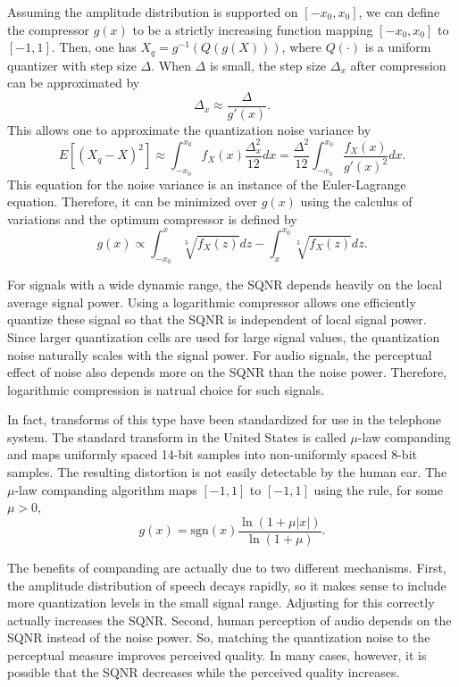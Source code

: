 Assuming the amplitude distribution is supported on $[-x_0 , x_0 ]$, we can define the compressor $g(x)$ to be a strictly increasing function mapping $[ -x_0 , x_0 ]$ to $[ -1 , 1 ]$.
Then, one has $X_q = g^{-1} \left( Q \left( g(X) \right) \right)$, where $Q(\cdot)$ is a uniform quantizer with step size $\Delta$.
When $\Delta$ is small, the step size $\Delta_x$ after compression can be approximated by
\[ \Delta_x \approx \frac{\Delta}{g'(x)}. \]
This allows one to approximate the quantization noise variance by
\[ E \left[ (X_q - X)^2 \right] \approx \int_{-x_0}^{x_0} f_X (x) \frac{\Delta_x^2}{12} dx = \frac{\Delta^2}{12} \int_{-x_0}^{x_0} \frac{f_X (x)}{g'(x)^2} dx. \]
This equation for the noise variance is an instance of the Euler-Lagrange equation.
Therefore, it can be minimized over $g(x)$ using the calculus of variations and the optimum compressor is defined by
\[ g(x) \propto \int_{-x_0}^{x} \sqrt[3]{f_X (z)} dz - \int_{x}^{x_0} \sqrt[3]{f_X (z)} dz . \]

For signals with a wide dynamic range, the SQNR depends heavily on the local average signal power.
Using a logarithmic compressor allows one efficiently quantize these signal so that the SQNR is independent of local signal power.
Since larger quantization cells are used for large signal values, the quantization noise naturally scales with the signal power.
For audio signals, the perceptual effect of noise also depends more on the SQNR than the noise power.
Therefore, logarithmic compression is natrual choice for such signals.

In fact, transforms of this type have been standardized for use in the telephone system.
The standard transform in the United States is called $\mu$-law companding and maps uniformly spaced 14-bit samples into non-uniformly spaced 8-bit samples.
The resulting distortion is not easily detectable by the human ear.
The $\mu$-law companding algorithm maps $[-1,1]$ to $[-1,1]$ using the rule, for some $\mu >0$,
\[ g(x) = \mathrm{sgn}(x)\frac{\ln \left( 1+ \mu |x| \right)}{\ln (1+\mu)}. \]

The benefits of companding are actually due to two different mechanisms.
First, the amplitude distribution of speech decays rapidly, so it makes sense to include more quantization levels in the small signal range.
Adjusting for this correctly actually increases the SQNR.
Second, human perception of audio depends on the SQNR instead of the noise power.
So, matching the quantization noise to the perceptual measure improves perceived quality.
In many cases, however, it is possible that the SQNR decreases while the perceived quality increases.

